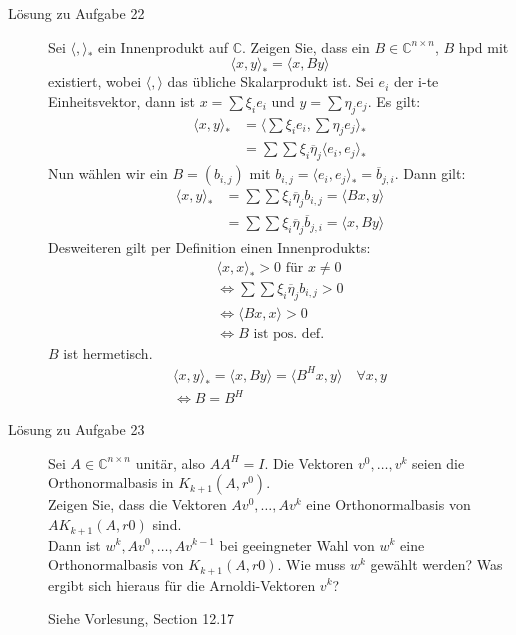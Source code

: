 \documentclass[a4paper,11pt]{scrartcl}
\begin{document}
\begin{description}
\item[Lösung zu Aufgabe 22]
Sei $\langle ,\rangle_*$ ein Innenprodukt auf $\mathbb{C}$. Zeigen Sie, dass ein $B \in \mathbb{C}^{n\times n}$, $B$ hpd mit 
\begin{equation*}
\langle x, y\rangle_* = \langle x, By \rangle
\end{equation*}
existiert, wobei $\langle , \rangle$ das übliche Skalarprodukt ist.
\medskip
 \vspace{2cm}
Sei $e_i$ der i-te Einheitsvektor, dann ist $x = \sum \xi_i e_i$ und $y = \sum \eta_j e_j$. Es gilt:
\begin{align*}
\langle x, y\rangle_* & = \langle \sum \xi_i e_i, \sum \eta_j e_j\rangle_*\\
& = \sum \sum \xi_i \overline{\eta}_j \langle e_i, e_j\rangle_*
\end{align*}
Nun wählen wir ein $B = (b_{i,j})$ mit $b_{i,j} = \langle e_i, e_j\rangle_* = \overline{b}_{j,i}$.
Dann gilt: 
\begin{align*}
	\langle x,y\rangle_* &= \sum\sum \xi_i \overline{\eta}_j b_{i,j} = \langle B x, y\rangle\\
	& = \sum\sum \xi_i \overline{\eta}_j \overline{b}_{j,i} = \langle x, B y\rangle
\end{align*}
 Desweiteren gilt per Definition einen Innenprodukts:
 \begin{align*}
 \langle x, x \rangle_* > 0 \text{ für } x\neq 0\\
 \Leftrightarrow \sum \sum \xi_i \overline{\eta}_j b_{i,j} > 0\\
 \Leftrightarrow \langle B x , x\rangle > 0 \\
 \Leftrightarrow B \text{ ist pos. def.}
 \end{align*}
 $B$ ist hermetisch.
 \begin{align*}
 \langle x, y\rangle_* = \langle x, B y\rangle = \langle B^H x, y\rangle \quad \forall x, y\\
\Leftrightarrow B = B^H
 \end{align*}
\item[Lösung zu Aufgabe 23]
Sei $A \in \mathbb{C}^{n \times n}$ unitär, also $A A^H = I$. Die Vektoren $v^0, \ldots, v^k$ seien die Orthonormalbasis in $K_{k+1}(A, r^0)$. \\
Zeigen Sie, dass die Vektoren $Av^0, \ldots, Av^k$ eine Orthonormalbasis von $A K_{k+1}(A,r0)$ sind.\\
Dann ist ${w^k, Av^0, \ldots, Av^{k-1}}$ bei geeingneter Wahl von $w^k$ eine Orthonormalbasis von $K_{k+1}(A,r0)$. Wie muss $w^k$ gewählt werden? 
Was ergibt sich hieraus für die Arnoldi-Vektoren $v^k$? 

\medskip
 \vspace{2cm}
 Siehe Vorlesung, Section 12.17

\end{description}
\end{document}
